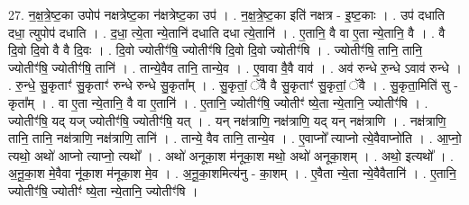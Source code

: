 \documentclass[17pt]{extarticle}
\begin{document}
27. न॒क्ष॒त्रे॒ष्ट॒का उपोप॑ नक्षत्रेष्ट॒का न॑क्षत्रेष्ट॒का उप॑ । . न॒क्ष॒त्रे॒ष्ट॒का इति॑ नक्षत्र - इ॒ष्ट॒काः । . उप॑ दधाति दधा॒ त्युपोप॑ दधाति । . द॒धा॒ त्ये॒ता न्ये॒तानि॑ दधाति दधा त्ये॒तानि॑ । . ए॒तानि॒ वै वा ए॒ता न्ये॒तानि॒ वै । . वै दि॒वो दि॒वो वै वै दि॒वः । . दि॒वो ज्योतीꣳ॑षि॒ ज्योतीꣳ॑षि दि॒वो दि॒वो ज्योतीꣳ॑षि । . ज्योतीꣳ॑षि॒ तानि॒ तानि॒ ज्योतीꣳ॑षि॒ ज्योतीꣳ॑षि॒ तानि॑ । . तान्ये॒वैव तानि॒ तान्ये॒व । . ए॒वावा वै॒वै वाव॑ । . अव॑ रुन्धे रु॒न्धे ऽवाव॑ रुन्धे । . रु॒न्धे॒ सु॒कृताꣳ॑ सु॒कृताꣳ॑ रुन्धे रुन्धे सु॒कृता᳚म् । . सु॒कृतां॒ ॅवै वै सु॒कृताꣳ॑ सु॒कृतां॒ ॅवै । . सु॒कृता॒मिति॑ सु - कृता᳚म् । . वा ए॒ता न्ये॒तानि॒ वै वा ए॒तानि॑ । . ए॒तानि॒ ज्योतीꣳ॑षि॒ ज्योतीꣳ॑ ष्ये॒ता न्ये॒तानि॒ ज्योतीꣳ॑षि । . ज्योतीꣳ॑षि॒ यद् यज् ज्योतीꣳ॑षि॒ ज्योतीꣳ॑षि॒ यत् । . यन् नक्ष॑त्राणि॒ नक्ष॑त्राणि॒ यद् यन् नक्ष॑त्राणि । . नक्ष॑त्राणि॒ तानि॒ तानि॒ नक्ष॑त्राणि॒ नक्ष॑त्राणि॒ तानि॑ । . तान्ये॒ वैव तानि॒ तान्ये॒व । . ए॒वाप्नो᳚ त्याप्नो त्ये॒वैवाप्नो॑ति । . आ॒प्नो॒ त्यथो॒ अथो॑ आप्नो त्याप्नो॒ त्यथो᳚ । . अथो॑ अनूका॒श म॑नूका॒श मथो॒ अथो॑ अनूका॒शम् । . अथो॒ इत्यथो᳚ । . अ॒नू॒का॒श मे॒वैवा नू॑का॒श म॑नूका॒श मे॒व । . अ॒नू॒का॒शमित्य॑नु - का॒शम् । . ए॒वैता न्ये॒ता न्ये॒वैवैतानि॑ । . ए॒तानि॒ ज्योतीꣳ॑षि॒ ज्योतीꣳ॑ ष्ये॒ता न्ये॒तानि॒ ज्योतीꣳ॑षि । \newline
\end{document}
